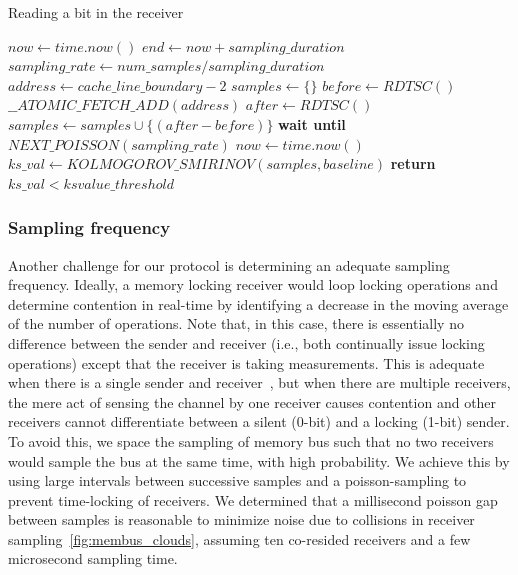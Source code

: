 \begin{algorithm}[!t]
\caption{Reading a bit in the receiver}
\label{alg:receiver}
\begin{algorithmic}[1]
\STATE $now \leftarrow  time.now()$
\STATE $end \leftarrow now + sampling\_duration$
\STATE $sampling\_rate \leftarrow num\_samples / sampling\_duration$
\STATE $address \leftarrow cache\_line\_boundary-2$
\STATE $samples \leftarrow \{\} $
    \STATE $before \leftarrow RDTSC()$
    \STATE $\_\_ATOMIC\_FETCH\_ADD(address)$
    \STATE $after \leftarrow RDTSC()$
    \STATE $samples \leftarrow samples \cup \{(after-before)\}$
    \STATE \textbf{wait until} $NEXT\_POISSON(sampling\_rate)$
    \STATE $now \leftarrow  time.now()$
\ENDWHILE
\STATE $ks\_val \leftarrow KOLMOGOROV\_SMIRINOV(samples, baseline)$
\STATE \textbf{return} $ks\_val < ksvalue\_threshold$
\end{algorithmic}
\end{algorithm}


\subsubsection{Sampling frequency}
Another challenge for our protocol is determining an adequate sampling
frequency. Ideally, a memory locking receiver would loop locking operations and
determine contention in real-time by identifying a decrease in the moving
average of the number of operations. Note that, in this case, there is
essentially no difference between the sender and receiver (i.e., both
continually issue locking operations) except that the receiver is taking
measurements. This is adequate when there is a single sender and
receiver~\cite{varadarajan2015}, but when there are multiple receivers, the mere
act of sensing the channel by one receiver causes contention and other receivers
cannot differentiate between a silent (0-bit) and a locking (1-bit) sender. To
avoid this, we space the sampling of memory bus such that no two receivers would
sample the bus at the same time, with high probability. We achieve this by
using large intervals between successive samples and a poisson-sampling to
prevent time-locking of receivers. We determined that a millisecond poisson gap
between samples is reasonable to minimize noise due to collisions in receiver
sampling~\ref{fig:membus_clouds}, assuming ten co-resided receivers and a few
microsecond sampling time.

